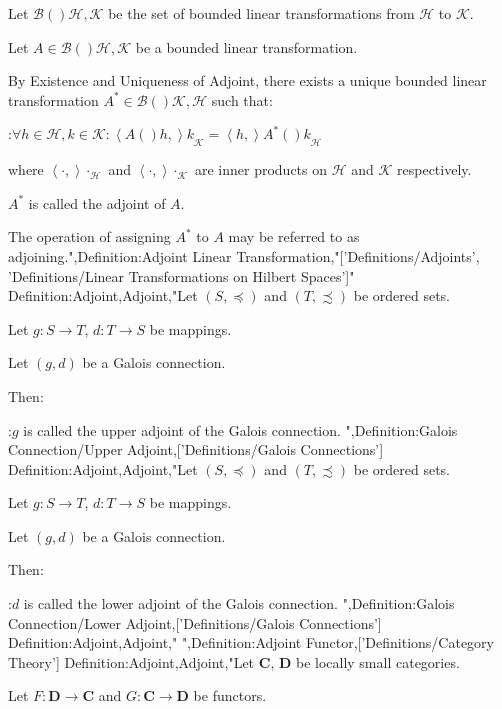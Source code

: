 Let $\mathcal B \left(   \right){\mathcal H, \mathcal K}$ be the set of bounded linear transformations from $\mathcal H$ to $\mathcal K$.

Let $A \in \mathcal B \left(   \right){\mathcal H, \mathcal K}$ be a bounded linear transformation.


By Existence and Uniqueness of Adjoint, there exists a unique bounded linear transformation $A^* \in \mathcal B \left(   \right){\mathcal K, \mathcal H}$ such that:

:$\forall h \in \mathcal H, k \in \mathcal K: {\left\langle A \left(   \right)h,   \right\rangle k}_\mathcal K = {\left\langle h,   \right\rangle{A^* \left(   \right)k} }_\mathcal H$

where $\left\langle \cdot,   \right\rangle\cdot_\mathcal H$ and $\left\langle \cdot,   \right\rangle\cdot_\mathcal K$ are inner products on $\mathcal H$ and $\mathcal K$ respectively.


$A^*$ is called the adjoint of $A$.


The operation of assigning $A^*$ to $A$ may be referred to as adjoining.",Definition:Adjoint Linear Transformation,"['Definitions/Adjoints', 'Definitions/Linear Transformations on Hilbert Spaces']"
Definition:Adjoint,Adjoint,"Let $\left( S, \preceq \right)$ and $\left( T, \precsim \right)$ be ordered sets.

Let $g: S \to T$, $d: T \to S$ be mappings.

Let $\left( g, d \right)$ be a Galois connection.


Then:

:$g$ is called the upper adjoint of the Galois connection.
",Definition:Galois Connection/Upper Adjoint,['Definitions/Galois Connections']
Definition:Adjoint,Adjoint,"Let $\left( S, \preceq \right)$ and $\left( T, \precsim \right)$ be ordered sets.

Let $g: S \to T$, $d: T \to S$ be mappings.

Let $\left( g, d \right)$ be a Galois connection.


Then:

:$d$ is called the lower adjoint of the Galois connection.
",Definition:Galois Connection/Lower Adjoint,['Definitions/Galois Connections']
Definition:Adjoint,Adjoint,"
",Definition:Adjoint Functor,['Definitions/Category Theory']
Definition:Adjoint,Adjoint,"Let $\mathbf C$, $\mathbf D$ be locally small categories.

Let $F : \mathbf D \to \mathbf C$ and $G : \mathbf C \to \mathbf D$ be functors.


